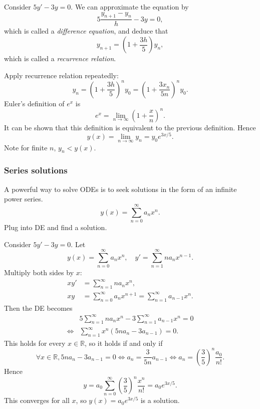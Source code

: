 \documentclass[a4paper]{article}
\newcommand{\bluecomment}[1]{{\color{blue}#1}}
\begin{document}
    \begin{example}
        Consider $ 5y'-3y=0 $. We can approximate the equation by 
        \[
            5\frac{y_{n+1}-y_n}{h}-3y=0
        ,\]
        which is called a \textit{difference equation}, and deduce that 
        \[
            y_{n+1}=\left( 1+\frac{3h}{5} \right)y_n
        ,\]
        which is called a \textit{recurrence relation}.

        Apply recurrence relation repeatedly:
        \[
            y_n=\left( 1+\frac{3h}{5} \right)^{n}y_{0}=\left( 1+\frac{3x_n}{5n} \right)^{n}y_{0}
        .\]
        Euler's definition of $ e^x $ is 
        \[
            e^x=\lim_{n \to \infty} \left( 1+\frac{x}{n} \right)^n
        .\]
        It can be shown that this definition is equivalent to the previous definition. Hence 
        \[
            y(x)=\lim_{n \to \infty} y_n = y_0e^{3x/5}
        .\]
        \bluecomment{Note for finite $n$, $y_n<y(x)$.}
    \end{example}
    \subsubsection{Series solutions}
    A powerful way to solve ODEs is to seek solutions in the form of an infinite power series. 
    \[
        y(x)=\sum_{n=0}^{\infty}a_n x^n
    .\]
    Plug into DE and find a solution.
    \begin{example}
        Consider $ 5y'-3y=0 $. Let 
        \[
            y(x)=\sum_{n=0}^{\infty}a_n x^n, \quad y'=\sum_{n=1}^{\infty}na_n x^{n-1}
        .\]
        Multiply both sides by $x$:
        \[
            \begin{aligned}
                xy'&=\sum_{n=1}^{\infty}na_nx^n,\\
                xy&= \sum_{n=0}^{\infty}a_n x^{n+1}=\sum_{n=1}^{\infty}a_{n-1} x^{n}.
            \end{aligned}
        \]
        Then the DE becomes 
        \[
            \begin{aligned}
                &5\sum_{n=1}^{\infty}na_nx^n-3\sum_{n=1}^{\infty}a_{n-1} x^{n}=0\\
                \Longleftrightarrow & \sum_{n=1}^{\infty}x^n\left( 5na_n-3a_{n-1} \right)=0.
            \end{aligned}
        \]
        This holds for every $x\in \mathbb{R}$, so it holds if and only if
        \[
            \forall x\in \mathbb{R}, 5na_n-3a_{n-1}=0 \Longleftrightarrow a_n = \frac{3}{5n}a_{n-1} \Longleftrightarrow a_n=\left( \frac{3}{5} \right)^n \frac{a_0}{n!}
        .\]
        Hence
        \[
            y= a_0\sum_{n=0}^{\infty} \left( \frac{3}{5} \right)^n \frac{x^n}{n!} = a_0 e^{3x/5}
        .\]
        This converges for all $x$, so $ y(x)=a_0 e^{3x/5} $ is a solution.
    \end{example}
\end{document}
